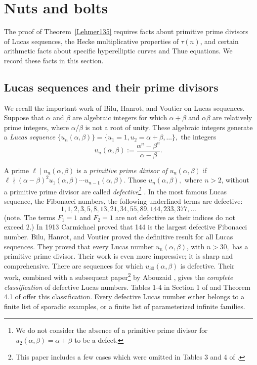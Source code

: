\documentclass[12pt]{amsart}
\numberwithin{equation}{section}
\begin{document}
\section{Nuts and bolts}

The proof of Theorem~\ref{Lehmer135} requires facts about primitive prime divisors of Lucas sequences,
the Hecke multiplicative properties of $\tau(n)$, and certain arithmetic facts about specific hyperelliptic curves and Thue equations.
We record these facts in this section.

\subsection{Lucas sequences and their prime divisors}
We recall the important work of Bilu, Hanrot, and Voutier \cite{BHV} on Lucas sequences.
Suppose that $\alpha$ and $\beta$ are algebraic integers for which $\alpha+\beta$ and $\alpha \beta$
are relatively prime integers, where $\alpha/\beta$ is not a root of unity.
These algebraic integers generate a {\it Lucas sequence} $\{u_n(\alpha,\beta)\}=\{u_1=1, u_2=\alpha+\beta,\dots\},$  the integers
\begin{equation}
u_n(\alpha,\beta):=\frac{\alpha^n-\beta^n}{\alpha-\beta}.
\end{equation}

A prime  $\ell \mid u_{n}(\alpha,\beta)$ is a {\it primitive prime divisor of $u_n(\alpha,\beta)$} if $\ell \nmid (\alpha-\beta)^2 u_1(\alpha,\beta)\cdots u_{n-1}(\alpha, \beta)$.  
Those $u_n(\alpha,\beta),$ where $n>2$, without a primitive prime divisor are called {\it defective\footnote{We do not consider the absence of
a primitive prime divisor for $u_2(\alpha,\beta)=\alpha+\beta$ to be   a defect.} .}
In the most famous Lucas sequence, the Fibonacci numbers, the following underlined terms are defective:
$$
1, 1, 2, 3, 5, \underbar{8}, 13, 21, 34, 55, 89, \underbar{144}, 233, 377,\dots
$$
 (note. The terms  $F_1=1$ and $F_2=1$ are not defective as their indices do not exceed $2.$)
In 1913 Carmichael \cite{Carmichael} proved that 144 is the largest defective Fibonacci number.
Bilu, Hanrot, and Voutier \cite{BHV} proved the definitive result for all Lucas sequences.
They proved that every Lucas number $u_n(\alpha,\beta)$, with $n>30,$
has a primitive prime divisor.
Their work is even more impressive; it is sharp and comprehensive.
There are sequences for which $u_{30}(\alpha,\beta)$
is defective.  Their work, combined with a subsequent paper\footnote{This paper includes a few cases which were omitted in Tables 3 and 4 of \cite{BHV}.}
by Abouzaid \cite{Abouzaid},  gives the {\it complete classification} of
defective Lucas numbers.
Tables 1-4 in Section 1 of \cite{BHV} and Theorem 4.1 of \cite{Abouzaid} offer this
classification. Every defective Lucas number either belongs to a  finite list of sporadic examples, or
a finite list of parameterized infinite families.
\end{document}
